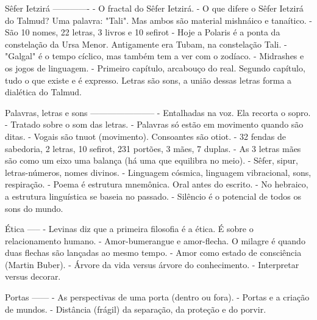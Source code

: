 Sêfer Ietzirá
-------------
- O fractal do Sêfer Ietzirá.
- O que difere o Sêfer Ietzirá do Talmud? Uma palavra: "Tali". Mas ambos são material mishnáico e tanaítico.
- São 10 nomes, 22 letras, 3 livros e 10 sefirot
- Hoje a Polaris é a ponta da constelação da Ursa Menor. Antigamente era Tubam, na constelação Tali.
- "Galgal" é o tempo cíclico, mas também tem a ver com o zodíaco.
- Midrashes e os jogos de linguagem.
- Primeiro capítulo, arcabouço do real. Segundo capítulo, tudo o que existe e é expresso. Letras são sons, a união dessas letras forma a dialética do Talmud.

Palavras, letras e sons
-----------------------
- Entalhadas na voz. Ela recorta o sopro.
- Tratado sobre o som das letras.
- Palavras só estão em movimento quando são ditas.
- Vogais são tnuot (movimento). Consoantes são otiot.
- 32 fendas de sabedoria, 2 letras, 10 sefirot, 231 portões, 3 mães, 7 duplas.
- As 3 letras mães são como um eixo uma balança (há uma que equilibra no meio).
- Sêfer, sipur, letras-números, nomes divinos.
- Linguagem cósmica, linguagem vibracional, sons, respiração.
- Poema é estrutura mnemônica. Oral antes do escrito.
- No hebraico, a estrutura linguística se baseia no passado.
- Silêncio é o potencial de todos os sons do mundo.

Ética
-----
- Levinas diz que a primeira filosofia é a ética. É sobre o relacionamento humano.
- Amor-bumerangue e amor-flecha. O milagre é quando duas flechas são lançadas ao mesmo tempo.
- Amor como estado de consciência (Martin Buber).
- Árvore da vida versus árvore do conhecimento.
- Interpretar versus decorar.

Portas
------
- As perspectivas de uma porta (dentro ou fora).
- Portas e a criação de mundos.
- Distância (frágil) da separação, da proteção e do porvir.

